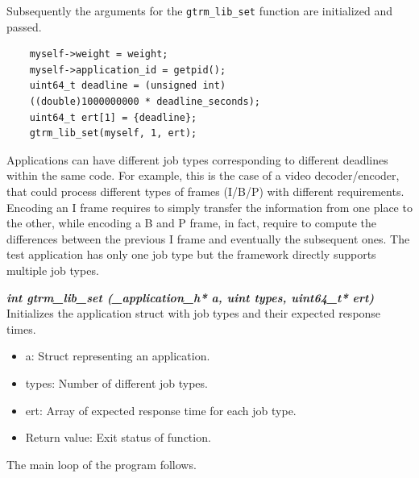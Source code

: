 \documentclass[nobiblatex]{LTHthesis}
\begin{document}
Subsequently the arguments for the \texttt{gtrm\_lib\_set} function
are initialized and passed.
\begin{lstlisting}	
	myself->weight = weight;
	myself->application_id = getpid();
	uint64_t deadline = (unsigned int) 
    ((double)1000000000 * deadline_seconds);
	uint64_t ert[1] = {deadline};
	gtrm_lib_set(myself, 1, ert);
\end{lstlisting}
Applications can have different job types corresponding to different 
deadlines within the same code. For example, this is the case of a video
decoder/encoder, that could process different types of frames (I/B/P)
with different requirements. Encoding an I frame requires to simply
transfer the information from one place to the other, while encoding a B and
P frame, in fact, require to compute the differences between the previous
I frame and eventually the subsequent ones. The test application has 
only one job type but the framework directly supports multiple job types. 

\begin{framed}
	\begin{flushleft}		
		\emph{\textbf{{int gtrm\_lib\_set
    (\_application\_h* a, uint types, uint64\_t* ert)}}} \newline
		Initializes the application struct with job types and their 
    expected response times.
		\begin{itemize}
		  \item a: Struct representing an application.
		  \item types: Number of different job types.
		  \item ert: Array of expected response time for each job type.
		  \item Return value: Exit status of function.
    \end{itemize}
  \end{flushleft}
\end{framed}

The main loop of the program follows.
\end{document}
